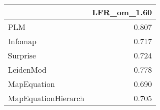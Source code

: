 \begin{tabular}{lr}
\toprule
{} & LFR_om_1.60 \\
\midrule
PLM                 &       0.807 \\
Infomap             &       0.717 \\
Surprise            &       0.724 \\
LeidenMod           &       0.778 \\
MapEquation         &       0.690 \\
MapEquationHierarch &       0.705 \\
\bottomrule
\end{tabular}
